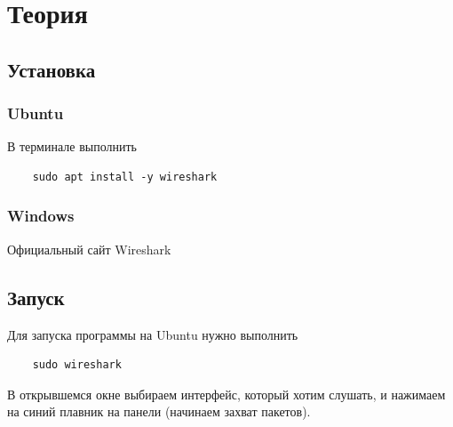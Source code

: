 \chapter{Теория}

\section{Установка}

\subsection{Ubuntu}

В терминале выполнить 

\begin{lstlisting}
    sudo apt install -y wireshark
\end{lstlisting}

\subsection{Windows}
Официальный сайт Wireshark

\section{Запуск}
Для запуска программы на Ubuntu нужно выполнить

\begin{lstlisting}
    sudo wireshark
\end{lstlisting}

В открывшемся окне выбираем интерфейс, который хотим слушать, и нажимаем на синий плавник на панели (начинаем захват пакетов).
\endinput